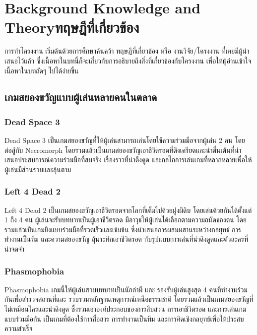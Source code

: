 \chapter{\ifenglish Background Knowledge and Theory\else ทฤษฎีที่เกี่ยวข้อง\fi}

การทำโครงงาน เริ่มต้นด้วยการศึกษาค้นคว้า ทฤษฎีที่เกี่ยวข้อง หรือ งานวิจัย/โครงงาน ที่เคยมีผู้นำเสนอไว้แล้ว ซึ่งเนื้อหาในบทนี้ก็จะเกี่ยวกับการอธิบายถึงสิ่งที่เกี่ยวข้องกับโครงงาน เพื่อให้ผู้อ่านเข้าใจเนื้อหาในบทถัดๆ ไปได้ง่ายขึ้น

\section{เกมสยองขวัญแบบผู้เล่นหลายคนในตลาด}
\subsection{Dead Space 3}

Dead Space 3 เป็นเกมสยองขวัญที่ให้ผู้เล่นสามารถเล่นโดยใช้ความร่วมมือจากผู้เล่น 2 คน โดยต่อสู้กับ Necromorph โดยรวมแล้วเป็นเกมสยองขวัญเอาชีวิตรอดที่ตึงเครียดและน่าตื่นเต้นที่นำเสนอประสบการณ์ความร่วมมือที่สมจริง เรื่องราวที่น่าดึงดูด และกลไกการเล่นเกมที่หลากหลายเพื่อให้ผู้เล่นมีส่วนร่วมและลุ้นตาม \cite{DeadSpace3}


\subsection{Left 4 Dead 2}

Left 4 Dead 2 เป็นเกมสยองขวัญเอาชีวิตรอดจากโลกที่เต็มไปด้วยฝูงผีดิบ โดยเล่นด้วยกันได้ตั้งแต่ 1 ถึง 4 คน ผู้เล่นจะรับบทบาทเป็นผู้เอาชีวิตรอด มีอาวุธให้ผู้เล่นได้เลือกตามความถนัดของตน โดยรวมแล้วเป็นเกมยิงแบบร่วมมือที่รวดเร็วและเข้มข้น ซึ่งนำเสนอการผสมผสานระหว่างกลยุทธ์ การทำงานเป็นทีม และความสยองขวัญ ลุ้นระทึกเอาชีวิตรอด กับรูปแบบการเล่นที่น่าดึงดูดและตัวละครที่น่าจดจำ \cite{L4D2}



\subsection{Phasmophobia}

Phasmophobia เกมนี้ให้ผู้เล่นสวมบทบาทเป็นนักล่าผี และ รองรับผู้เล่นสูงสุด 4 คนที่ทำงานร่วมกันเพื่อสำรวจสถานที่และ รวบรวมหลักฐานเหตุการณ์เหนือธรรมชาติ โดยรวมแล้วเป็นเกมสยองขวัญที่ไม่เหมือนใครและน่าดึงดูด ซึ่งรวมเอาองค์ประกอบของการสืบสวน การเอาชีวิตรอด และการเล่นเกมแบบร่วมมือกัน เป็นเกมที่ต้องใช้การสื่อสาร การทำงานเป็นทีม และการคิดเชิงกลยุทธ์เพื่อให้ประสบความสำเร็จ \cite{Phasmophobia}


